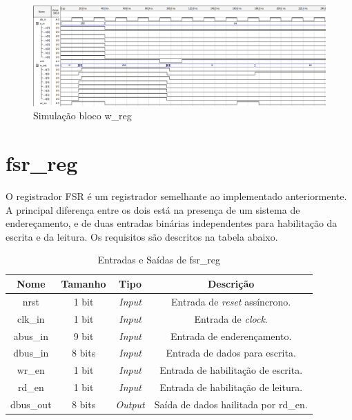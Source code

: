 \documentclass{article}
\begin{document}
\begin{figure}[ht]
\begin{center}
    \includegraphics[width=15cm]{images/w_reg.png}
    \caption{Simulação bloco w\_reg}
\end{center}
\end{figure}

\newpage

\section{fsr\_reg}

O registrador FSR é um registrador semelhante ao implementado anteriormente. A principal diferença entre os dois está na presença de um sistema de endereçamento, e de duas entradas binárias independentes para habilitação da escrita e da leitura. Os requisitos são descritos na tabela abaixo.

\begin{table}[ht]
    \begin{center}
        \begin{tabular}{|c|c|c|c|}
            \hline
            Nome & Tamanho & Tipo & Descrição\\
            \hline
            nrst & 1 bit & \textit{Input} & Entrada de \textit{reset} assíncrono.\\
            \hline
            clk\_in & 1 bit & \textit{Input} & Entrada de \textit{clock}.\\
            \hline
            abus\_in & 9 bit & \textit{Input} & Entrada de enderençamento.\\
            \hline
            dbus\_in & 8 bits & \textit{Input} & Entrada de dados para escrita.\\
            \hline
            wr\_en & 1 bit & \textit{Input} & Entrada de habilitação de escrita.\\
            \hline
            rd\_en & 1 bit & \textit{Input} & Entrada de habilitação de leitura.\\
            \hline
            dbus\_out & 8 bits & \textit{Output} & Saída de dados hailitada por rd\_en.\\
            \hline
        \end{tabular}
    \end{center}
    \caption{Entradas e Saídas de fsr\_reg}
\end{table}
\end{document}
